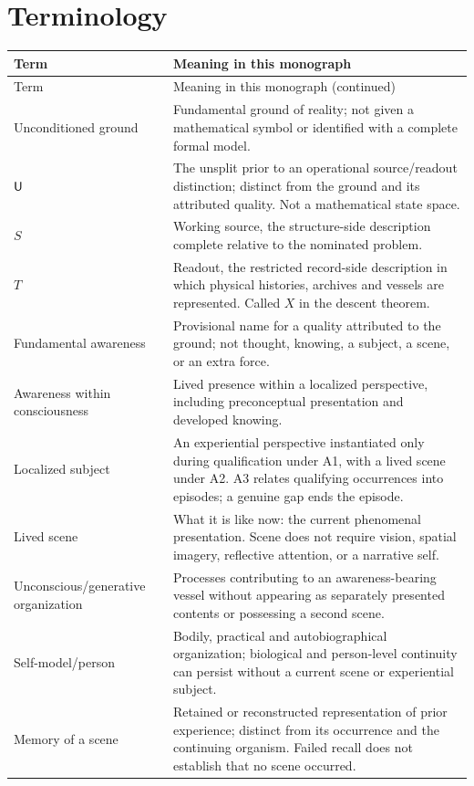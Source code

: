 \section*{Terminology}\label{sec:reader-terminology}
\begin{longtable}{@{}>{\raggedright\arraybackslash}p{}>{\raggedright\arraybackslash}p{}@{}}
\toprule Term & Meaning in this monograph\\\midrule\endfirsthead
\toprule Term & Meaning in this monograph (continued)\\\midrule\endhead
Unconditioned ground & Fundamental ground of reality; not given a mathematical symbol or identified with a complete formal model.\\
$\mathsf{U}$ & The unsplit prior to an operational source/readout distinction; distinct from the ground and its attributed quality. Not a mathematical state space.\\
$S$ & Working source, the structure-side description complete relative to the nominated problem.\\
$T$ & Readout, the restricted record-side description in which physical histories, archives and vessels are represented. Called $X$ in the descent theorem.\\
Fundamental awareness & Provisional name for a quality attributed to the ground; not thought, knowing, a subject, a scene, or an extra force.\\
Awareness within consciousness & Lived presence within a localized perspective, including preconceptual presentation and developed knowing.\\
Localized subject & An experiential perspective instantiated only during qualification under A1, with a lived scene under A2. A3 relates qualifying occurrences into episodes; a genuine gap ends the episode.\\
Lived scene & What it is like now: the current phenomenal presentation. Scene does not require vision, spatial imagery, reflective attention, or a narrative self.\\
Unconscious/\allowbreak generative organization & Processes contributing to an awareness-bearing vessel without appearing as separately presented contents or possessing a second scene.\\
Self-model/person & Bodily, practical and autobiographical organization; biological and person-level continuity can persist without a current scene or experiential subject.\\
Memory of a scene & Retained or reconstructed representation of prior experience; distinct from its occurrence and the continuing organism. Failed recall does not establish that no scene occurred.\\

\end{longtable}
